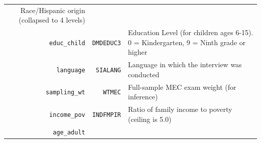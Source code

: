 \documentclass[
]{book}
\begin{document}
\begin{longtable}[]{@{}rrl@{}}
\begin{minipage}[t]{0.56\columnwidth}
Race/Hispanic origin (collapsed to 4 levels)\strut
\end{minipage}\tabularnewline
\begin{minipage}[t]{0.20\columnwidth}\raggedleft
\texttt{educ\_child}\strut
\end{minipage} & \begin{minipage}[t]{0.16\columnwidth}\raggedleft
\texttt{DMDEDUC3}\strut
\end{minipage} & \begin{minipage}[t]{0.56\columnwidth}\raggedright
Education Level (for children ages 6-15). 0 = Kindergarten, 9 = Ninth grade or higher\strut
\end{minipage}\tabularnewline
\begin{minipage}[t]{0.20\columnwidth}\raggedleft
\texttt{language}\strut
\end{minipage} & \begin{minipage}[t]{0.16\columnwidth}\raggedleft
\texttt{SIALANG}\strut
\end{minipage} & \begin{minipage}[t]{0.56\columnwidth}\raggedright
Language in which the interview was conducted\strut
\end{minipage}\tabularnewline
\begin{minipage}[t]{0.20\columnwidth}\raggedleft
\texttt{sampling\_wt}\strut
\end{minipage} & \begin{minipage}[t]{0.16\columnwidth}\raggedleft
\texttt{WTMEC}\strut
\end{minipage} & \begin{minipage}[t]{0.56\columnwidth}\raggedright
Full-sample MEC exam weight (for inference)\strut
\end{minipage}\tabularnewline
\begin{minipage}[t]{0.20\columnwidth}\raggedleft
\texttt{income\_pov}\strut
\end{minipage} & \begin{minipage}[t]{0.16\columnwidth}\raggedleft
\texttt{INDFMPIR}\strut
\end{minipage} & \begin{minipage}[t]{0.56\columnwidth}\raggedright
Ratio of family income to poverty (ceiling is 5.0)\strut
\end{minipage}\tabularnewline
\begin{minipage}[t]{0.20\columnwidth}\raggedleft
\texttt{age\_adult}\strut
\end{minipage} & \begin{minipage}[t]{0.16\columnwidth}\raggedleft

\end{minipage}
\end{longtable}
\end{document}
